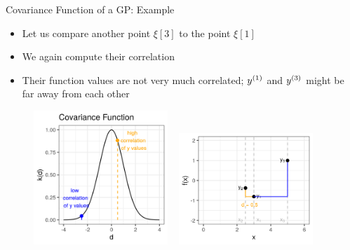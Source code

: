 \begin{vbframe}{Covariance Function of a GP: Example} 

\begin{itemize}
  \item Let us compare another point $\xi[3]$ to the point $\xi[1]$
  \item We again compute their correlation
  \item Their function values are not very much correlated; $\yi[1]$ and $\yi[3]$ might be far away from each other
\end{itemize}

\begin{figure}
  \includegraphics[width=0.45\textwidth]{figure_man/covariance2point/example_covariance_2.png} ~      \includegraphics[width=0.45\textwidth]{figure_man/covariance2point/example_function_2-1.png}
\end{figure}

\end{vbframe}




